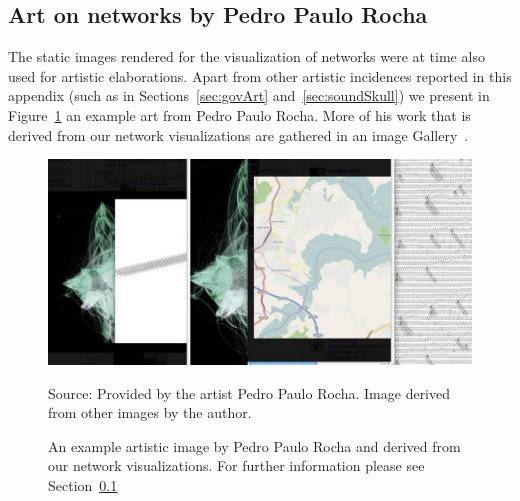 \begin{apendicesenv}
	\subsection{Art on networks by Pedro Paulo Rocha}\label{sec:ppr}
	The static images rendered for the visualization of networks were at time also used for artistic elaborations.
	Apart from other artistic incidences reported in this appendix (such as in Sections~\ref{sec:govArt} and~\ref{sec:soundSkull})
	we present in Figure~\ref{fig:ppr} an example art from Pedro Paulo Rocha.
	More of his work that is derived from our network visualizations are gathered in an image Gallery~\cite{pprGal}.
\begin{figure}[h!]
\begin{center}
\includegraphics[scale=.45]{figs/ppr}
\caption{An example artistic image by Pedro Paulo Rocha and derived from our network visualizations.
	For further information please see Section~\ref{sec:ppr}}
\label{fig:ppr}
\begin{flushleft}\footnotesize
Source: Provided by the artist Pedro Paulo Rocha. Image derived from other images by the author.\
\end{flushleft}
\end{center}
\end{figure}


\end{apendicesenv}
